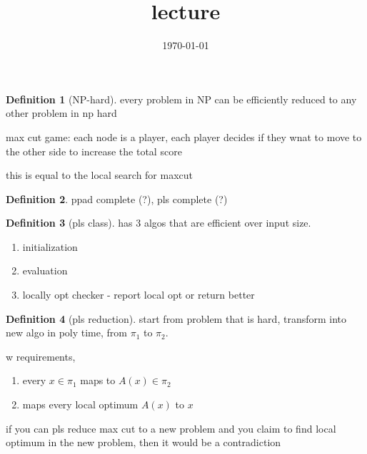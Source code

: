 \documentclass{article}
\title{lecture}
\date{\today}
\theoremstyle{definition}
\newtheorem{definition}{Definition}
\begin{document}
\maketitle




\begin{definition}[NP-hard]
    every problem in NP can be efficiently reduced to any other problem in np hard
\end{definition}


max cut game:
each node is a player, each player decides if they wnat to move to the other side to increase the total score

this is equal to the local search for maxcut

\begin{definition}
    ppad complete (?), pls complete (?)
\end{definition}

\begin{definition}[pls class]
    has 3 algos that are efficient over input size.
    \begin{enumerate}
        \item initialization
        \item evaluation
        \item locally opt checker - report local opt or return better
    \end{enumerate}
\end{definition}

\begin{definition}[pls reduction]
    start from problem that is hard, transform into new algo in poly time, from \(\pi_1\) to \(\pi_2\).

    w requirements,
    \begin{enumerate}
        \item every \(x\in \pi_1\) maps to \(A(x)\in \pi_2\)
        \item maps every local optimum \(A(x)\) to \(x\) 
    \end{enumerate}






\end{definition}

if you can pls reduce max cut to a new problem and you claim to find local optimum in the new problem, then it would be a contradiction
\end{document}
